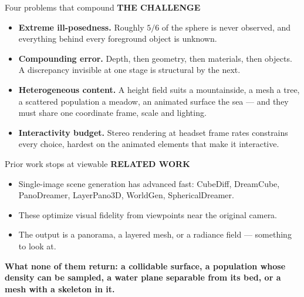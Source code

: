 \documentclass[aspectratio=169,11pt]{beamer}
\newcommand{\kicker}[1]{{\color{accent}\bfseries\scriptsize\MakeUppercase{#1}}\par\vspace{0.2em}}
\newcommand{\lead}[1]{{\color{ink}\bfseries #1}}
\newcommand{\quietx}[1]{{\color{muted}#1}}
\newcommand{\flag}[1]{{\color{warn}\bfseries #1}}
\begin{document}
\begin{frame}{Four problems that compound}
  \kicker{the challenge}
  \small
  \begin{itemize}\setlength\itemsep{0.85em}
    \item \lead{Extreme ill-posedness.} \quietx{Roughly $5/6$ of the sphere is never
          observed, and everything behind every foreground object is unknown.}
    \item \lead{Compounding error.} \quietx{Depth, then geometry, then materials,
          then objects. A discrepancy invisible at one stage is structural by the next.}
    \item \lead{Heterogeneous content.} \quietx{A height field suits a mountainside,
          a mesh a tree, a scattered population a meadow, an animated surface the
          sea --- and they must share one coordinate frame, scale and lighting.}
    \item \lead{Interactivity budget.} \quietx{Stereo rendering at headset frame
          rates constrains every choice, hardest on the animated elements that
          make it interactive.}
  \end{itemize}
\end{frame}

\begin{frame}{Prior work stops at viewable}
  \kicker{related work}
  \small
  \begin{itemize}\setlength\itemsep{0.7em}
    \item Single-image scene generation has advanced fast: CubeDiff, DreamCube,
          PanoDreamer, LayerPano3D, WorldGen, SphericalDreamer.
    \item These optimize visual fidelity from viewpoints near the original camera.
    \item The output is a panorama, a layered mesh, or a radiance field ---
          something to look at.
  \end{itemize}
  \vspace{1.2em}
  \flag{What none of them return: a collidable surface, a population whose density
  can be sampled, a water plane separable from its bed, or a mesh with a skeleton in it.}
\end{frame}
\end{document}
